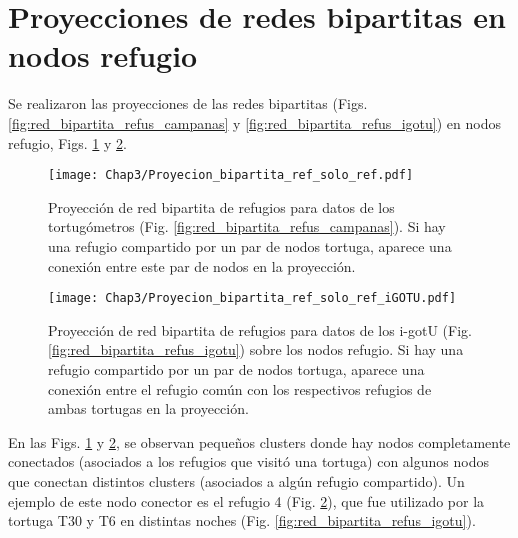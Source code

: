 \section{Proyecciones de redes bipartitas en nodos refugio}
Se realizaron las proyecciones de las redes bipartitas (Figs. \ref{fig:red_bipartita_refus_campanas} y \ref{fig:red_bipartita_refus_igotu}) en nodos refugio, Figs. \ref{fig:proyeccion_red_campanas_refus} y \ref{fig:proyeccion_red_igotu_refus}.
 
 
\begin{figure}[ht]
    \begin{center}
        \texttt{[image: Chap3/Proyecion\_bipartita\_ref\_solo\_ref.pdf]}
        \caption[Proyección  de red bipartita de refugios para datos de los tortugómetros en nodos refugio.]{Proyección  de red bipartita de refugios para datos de los tortugómetros (Fig. \ref{fig:red_bipartita_refus_campanas}). Si hay una refugio compartido por un par de nodos tortuga, aparece una conexión entre este par de nodos en la proyección. }
        \label{fig:proyeccion_red_campanas_refus}
       
        \end{center}
\end{figure}
 
\begin{figure}[ht]
    \begin{center}
        \texttt{[image: Chap3/Proyecion\_bipartita\_ref\_solo\_ref\_iGOTU.pdf]}
        \caption[Proyección  de red bipartita de refugios para datos de los i-gotU en nodos refugio.]{Proyección  de red bipartita de refugios para datos de los i-gotU (Fig. \ref{fig:red_bipartita_refus_igotu}) sobre los nodos refugio. Si hay una refugio compartido por un par de nodos tortuga, aparece una conexión entre el refugio común con los respectivos refugios de ambas tortugas en la proyección. }
        \label{fig:proyeccion_red_igotu_refus}
       
        \end{center}
\end{figure}
En las Figs. \ref{fig:proyeccion_red_campanas_refus} y \ref{fig:proyeccion_red_igotu_refus}, se observan pequeños clusters donde hay nodos completamente conectados (asociados a los refugios que visitó una tortuga) con algunos nodos que conectan distintos clusters (asociados a algún refugio compartido). Un ejemplo de este nodo conector es el refugio 4 (Fig. \ref{fig:proyeccion_red_igotu_refus}), que fue utilizado por la tortuga T30 y T6 en distintas noches (Fig. \ref{fig:red_bipartita_refus_igotu}).
 
